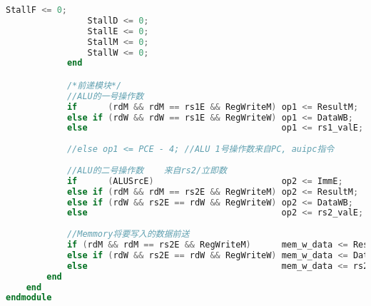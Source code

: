 \begin{lstlisting}[language = {verilog}]
                StallF <= 0;
                StallD <= 0;
                StallE <= 0;
                StallM <= 0;
                StallW <= 0;       
            end  

            /*前递模块*/
            //ALU的一号操作数
            if      (rdM && rdM == rs1E && RegWriteM) op1 <= ResultM;
            else if (rdW && rdW == rs1E && RegWriteW) op1 <= DataWB;
            else                                      op1 <= rs1_valE;  
            
            //else op1 <= PCE - 4; //ALU 1号操作数来自PC, auipc指令
            
            //ALU的二号操作数    来自rs2/立即数
            if      (ALUSrcE)                         op2 <= ImmE;       
            else if (rdM && rdM == rs2E && RegWriteM) op2 <= ResultM;
            else if (rdW && rs2E == rdW && RegWriteW) op2 <= DataWB;
            else                                      op2 <= rs2_valE;  
            
            //Memmory将要写入的数据前送
            if (rdM && rdM == rs2E && RegWriteM)      mem_w_data <= ResultM;
            else if (rdW && rs2E == rdW && RegWriteW) mem_w_data <= DataWB;
            else                                      mem_w_data <= rs2_valE;                   
        end
    end
endmodule
\end{lstlisting}

